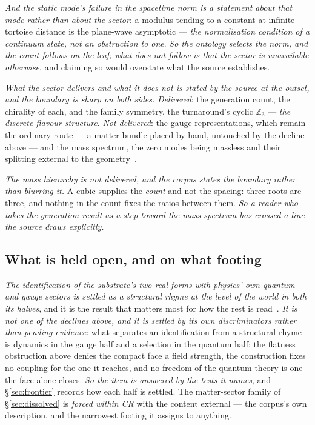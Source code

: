 \documentclass[11pt,a4paper]{article}
\theoremstyle{plain}
\theoremstyle{definition}
\begin{document}
\emph{And the static mode's failure in the spacetime norm is a statement about that mode rather than about
the sector}: a modulus tending to a constant at infinite tortoise distance is the plane-wave asymptotic ---
\emph{the normalisation condition of a continuum state, not an obstruction to one}. \emph{So the ontology
selects the norm, and the count follows on the leaf; what does not follow is that the sector is unavailable
otherwise}, and claiming so would overstate what the source establishes.

\emph{What the sector delivers and what it does not is stated by the source at the outset, and the boundary
is sharp on both sides.} \emph{Delivered}: the generation count, the chirality of each, and the family
symmetry, the turnaround's cyclic $\mathbb{Z}_3$ --- \emph{the discrete flavour structure}. \emph{Not delivered}: the gauge representations, which
remain the ordinary route --- a matter bundle placed by hand, untouched by the decline above --- and the mass
spectrum, the zero modes being massless and
their splitting external to the geometry~\cite{JanzenMatter}.

\emph{The mass hierarchy is not delivered, and the corpus states the boundary rather than blurring it.} A
cubic supplies the \emph{count} and not the spacing: three roots are three, and nothing in the count fixes
the ratios between them. \emph{So a reader who takes the generation result as a step toward the mass
spectrum has crossed a line the source draws explicitly.}

\subsection{What is held open, and on what footing}

\emph{The identification of the substrate's two real forms with physics' own quantum and gauge sectors is
settled as a structural rhyme at the level of the world in both its halves}, and it is the result that matters most for how the rest is read~\cite{JanzenBoundary}.
\emph{It is not one of the declines above, and it is settled by its own discriminators rather than pending
evidence}: what separates an identification from a structural rhyme is dynamics in the gauge half and a selection
in the quantum half; the flatness obstruction above denies the compact face a field strength, the construction
fixes no coupling for the one it reaches, and no freedom of the quantum theory is one the face alone closes.
\emph{So the item is answered by the tests it names}, and \S\ref{sec:frontier} records how each half is settled. The matter-sector family of \S\ref{sec:dissolved} is \emph{forced within CR} with the content external --- the corpus's own description, and the narrowest footing it assigns to
anything.
\end{document}
